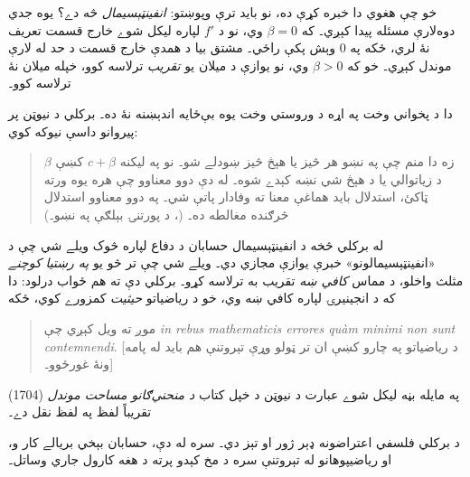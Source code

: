 \documentclass[../../../include/open-logic-section]{subfiles}
\begin{document}
خو چې هغوي دا خبره کړې ده، نو بايد ترې وپوښتو: \emph{انفينټېسيمال} څه دے؟ يوه جدي دوه‌لارې مسئله پيدا کېږي۔ که $\beta = 0$ وي، نو د $f'$ لپاره ليکل شوے خارج قسمت تعريف نۀ لري، ځکه په $0$ وېش پکې راځي۔ مشتق بيا د همدې خارج قسمت د حد له لارې موندل کېږي۔ خو که $\beta >
0$ وي، نو يوازې د ميلان يو \emph{تقريب} ترلاسه کوو، خپله ميلان نۀ ترلاسه کوو۔

دا د پخواني وخت په اړه د وروستي وخت يوه بې‌ځايه اندېښنه نۀ ده۔ برکلي د نيوټن پر پيروانو داسې نيوکه کوي:
\begin{quote}
زه دا منم چې په نښو هر څيز يا هېڅ څيز ښودلے شو۔ نو په ليکنه $c + \beta$ کښې $\beta$ د زياتوالي يا د هېڅ شي نښه کېدے شوه۔ له دې دوو معناوو چې هره يوه ورته ټاکئ، استدلال بايد هماغې معنا ته وفادار پاتې شي۔ په دوو معناوو استدلال څرګنده مغالطه ده۔ (\citealt[\S{}XV]{Berkeley1734}، د پورتنۍ بېلګې په نښو۔)
\end{quote}
له برکلي څخه د انفينټېسيمال حسابان د دفاع لپاره څوک ويلے شي چې د «انفينټېسيمالونو» خبرې يوازې مجازي دي۔ ويلے شي چې تر څو يو \emph{په رښتيا کوچنے} مثلث واخلو، د مماس \emph{کافي ښه} تقريب به ترلاسه کړو۔ برکلي دې ته هم ځواب درلود: دا که د انجينيرۍ لپاره کافي ښه وي، خو د رياضياتو \emph{حيثيت} کمزورے کوي، ځکه
\begin{quote}
موږ ته ويل کېږي چې \emph{in rebus mathematicis errores qu\`{a}m minimi
non sunt contemnendi}. [د رياضياتو په چارو کښې ان تر ټولو وړې تېروتنې هم بايد له پامه ونۀ غورځوو۔] \citep[\S{}IX]{Berkeley1734}
\end{quote}
په مايله بڼه ليکل شوے عبارت د نيوټن د خپل کتاب \emph{د منحني‌ګانو مساحت موندل} (1704) تقريباً لفظ په لفظ نقل دے۔

د برکلي فلسفي اعتراضونه ډېر ژور او تېز دي۔ سره له دې، حسابان بېخي بريالے کار و، او رياضيپوهانو له تېروتنې سره د مخ کېدو پرته د هغه کارول جاري وساتل۔
\end{document}
